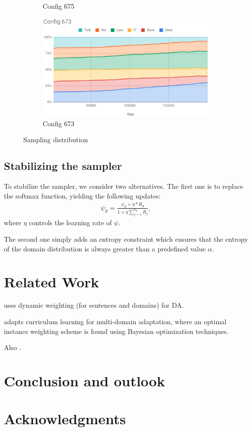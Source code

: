 \documentclass[11pt,a4paper]{article}
\newcommand{\fyTodo}[1]{\Todo[FY:]{\textcolor{orange}{#1}}}
\begin{document}
\begin{figure}[htb]
\begin{subfigure}{.5\textwidth}
  \caption{Config 675}
  \label{fig:675}
\end{subfigure}
\begin{subfigure}{.5\textwidth}
  \centering
  \includegraphics[width=.8\linewidth]{config673.png}  
  \caption{Config 673}
  \label{fig:673}
\end{subfigure}
\caption{Sampling distribution}
\label{fig:sampling}
\end{figure}

\subsection{Stabilizing the sampler \label{ssec:sampler}}

To stabilize the sampler, we consider two alternatives. The first one is to replace the softmax function, yielding the following updates:\fyTodo{List options}
\begin{align*}
\psi_d = \frac{\psi_d + \eta * R_d}{ 1 + \eta \displaystyle{\mathop{\sum}_{j=1}^{n_d}} R_j},
\end{align*}
where $\eta$ controls the learning rate of $\psi$.

The second one simply adds an entropy constraint which ensures that the entropy of the domain distribution is always greater than a predefined value $\alpha$.\fyTodo{Explain the math}

\section{Related Work \label{sec:related}}
\cite{Wang17instance} uses dynamic weighting (for sentences and domains) for DA.

\cite{Wang20learning-multi} adapts curriculum learning \cite{BengioXX} for multi-domain adaptation, where an optimal instance weighting scheme is found using Bayesian optimization techniques.

Also \cite{Saunders19adaptive}.

\section{Conclusion and outlook \label{sec:discussion}}
\section*{Acknowledgments}


\end{document}
